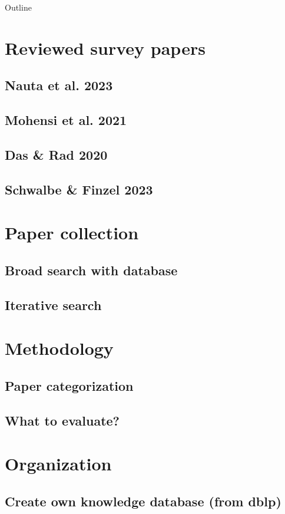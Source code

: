 \documentclass[presentation]{beamer}
\author{Louis}
\date{\today}
\title{}
\begin{document}
\begin{frame}{Outline}
\tableofcontents
\end{frame}

\section{Reviewed survey papers}
  \subsection{Nauta et al. 2023}
  \subsection{Mohensi et al. 2021}
  \subsection{Das \& Rad 2020}
  \subsection{Schwalbe \& Finzel 2023}
\section{Paper collection}
  \subsection{Broad search with database}
  \subsection{Iterative search}
\section{Methodology}
  \subsection{Paper categorization}
  \subsection{What to evaluate?}
\section{Organization}
  \subsection{Create own knowledge database (from dblp)}
\end{document}
